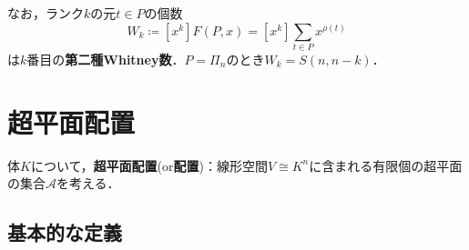 \documentclass[xelatex,ja=standard,a4paper,14pt,everyparhook=compat]{bxjsarticle}
\theoremstyle{definition}
\newtheorem{problem}{問題}
\begin{document}
なお，ランク$k$の元$t \in P$の個数 \begin{equation*}
    W_k \coloneqq [x^k] F(P,x) = [x^k] \sum_{t \in P} x^{\rho(t)}
\end{equation*}
は$k$番目の\textbf{第二種Whitney数}．$P=\Pi_n$のとき$W_k = S(n,n-k)$．




\section{超平面配置}

体$K$について，\textbf{超平面配置}(or\textbf{配置})：線形空間$V \cong K^n$に含まれる有限個の超平面の集合$\mathcal{A}$を考える．

\subsection{基本的な定義}
\end{document}
